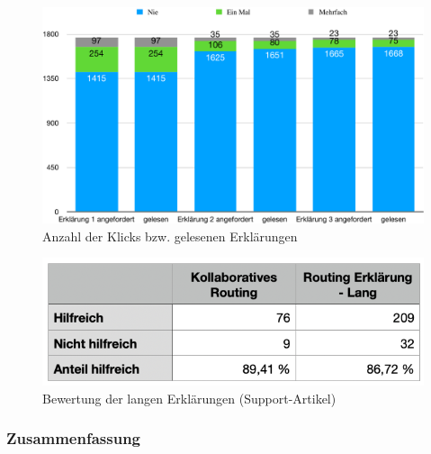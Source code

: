 \begin{figure}
    \centering
    \includegraphics[width=\linewidth]{contents/06_model_evaluation/res/explanation_results_clicked.pdf}
    \caption{Anzahl der Klicks bzw. gelesenen Erklärungen}
    \label{fig:explanation_results_clicked}
\end{figure}

\begin{figure}
    \centering
    \includegraphics[width=\linewidth]{contents/06_model_evaluation/res/explanation_results_clicked_support.png}
    \caption{Bewertung der langen Erklärungen (Support-Artikel)}
    \label{tab:explanation_results_clicked}
\end{figure}

\subsubsection{Zusammenfassung}

